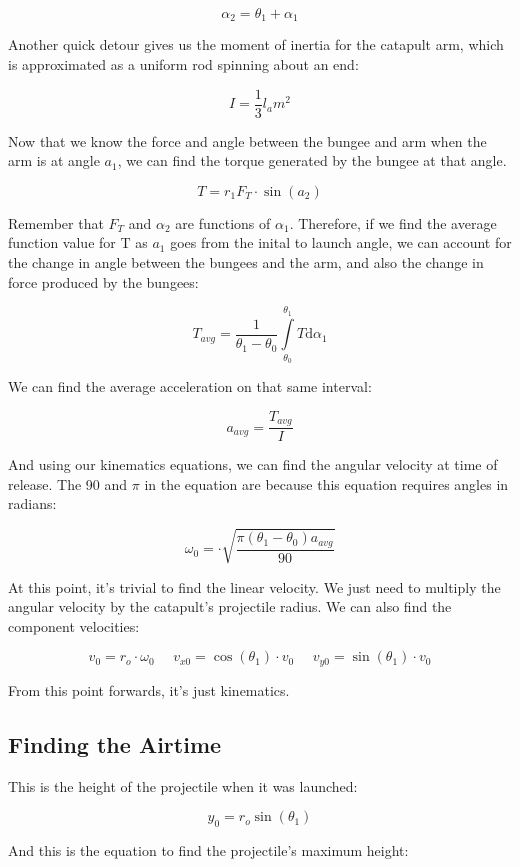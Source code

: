 \documentclass[10pt]{article}
\begin{document}
\begin{flushleft}
    $$\alpha_2 = \theta_1 + \alpha_1$$

    Another quick detour gives us the moment of inertia for the catapult arm, which is approximated as a uniform rod spinning about an end:

    $$I = \frac{1}{3} l_a m^2$$

    Now that we know the force and angle between the bungee and arm when the arm is at angle $a_1$, we can find the torque generated by the bungee at that angle.

    $$ T = r_1 F_T \cdot \sin(a_2) $$

    Remember that $F_T$ and $\alpha_2$ are functions of $\alpha_1$. 
    Therefore, if we find the average function value for T as $a_1$ goes from the inital to launch angle, we can account for the change in angle between the bungees and the arm, and also the change in force produced by the bungees:

    $$ T_{avg} = \frac{1}{\theta_1 - \theta_0} \int\limits_{\theta_0}^{\theta_1} T \mathrm{d} \alpha_1$$

    We can find the average acceleration on that same interval:

    $$ a_{avg} = \frac{T_{avg}}{I} $$
    
    And using our kinematics equations, we can find the angular velocity at time of release. The 90 and $\pi$ in the equation are because this equation requires angles in radians:

    $$\omega_0 = \cdot \sqrt{\frac{\pi (\theta_1 - \theta_0) a_{avg}}{90}}$$

    At this point, it's trivial to find the linear velocity. We just need to multiply the angular velocity by the catapult's projectile radius. We can also find the component velocities:
    
    $$ v_0 = r_o \cdot \omega_0  \ \ \ \ \ \ v_{x0} = \cos(\theta_1) \cdot v_0 \ \ \ \ \ \ v_{y0} = \sin(\theta_1) \cdot v_0 $$

    From this point forwards, it's just kinematics.

    \subsection{Finding the Airtime}

    This is the height of the projectile when it was launched:

    $$ y_0 = r_o \sin(\theta_1) $$

    And this is the equation to find the projectile's maximum height:


\end{flushleft}
\end{document}
